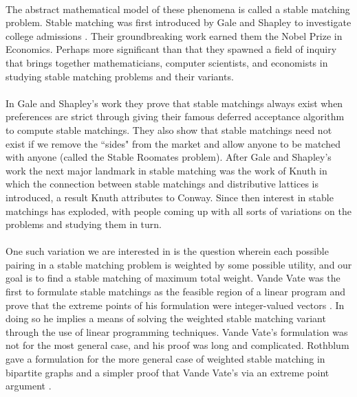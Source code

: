 \paragraph{}
The abstract mathematical model of these phenomena is called a stable matching problem. Stable matching was first introduced by Gale and Shapley to investigate college admissions \cite{gale1962college}. Their groundbreaking work earned them the Nobel Prize in Economics. Perhaps more significant than that they spawned a field of inquiry that brings together mathematicians, computer scientists, and economists in studying stable matching problems and their variants.
\paragraph{}
In Gale and Shapley's work they prove that stable matchings always exist when preferences are strict through giving their famous deferred acceptance algorithm to compute stable matchings. They also show that stable matchings need not exist if we remove the ``sides" from the market and allow anyone to be matched with anyone (called the Stable Roomates problem). After Gale and Shapley's work the next major landmark in stable matching was the work of Knuth \cite{knuthmariages} in which the connection between stable matchings and distributive lattices is introduced, a result Knuth attributes to Conway. Since then interest in stable matchings has exploded, with people coming up with all sorts of variations on the problems and studying them in turn.
\paragraph{}
One such variation we are interested in is the question wherein each possible pairing in a stable matching problem is weighted by some possible utility, and our goal is to find a stable matching of maximum total weight. Vande Vate was the first to formulate stable matchings as the feasible region of a linear program and prove that the extreme points of his formulation were integer-valued vectors \cite{vate1989linear}. In doing so he implies a means of solving the weighted stable matching variant through the use of linear programming techniques. Vande Vate's formulation was not for the most general case, and his proof was long and complicated. Rothblum gave a formulation for the more general case of weighted stable matching in bipartite graphs and a simpler proof that Vande Vate's via an extreme point argument \cite{rothblum1992characterization}.
